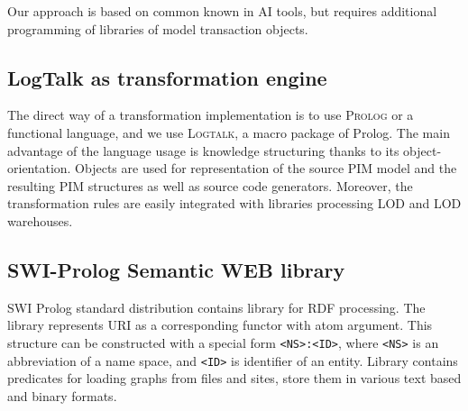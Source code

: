 \documentclass[conference]{IEEEtran}
\begin{document}


Our approach is based on common known in AI tools, but requires additional programming of libraries of model transaction objects.

\subsection{LogTalk as transformation engine}
\label{sec:logtalk-engine}

The direct way of a transformation implementation is to use \textsc{Prolog} or a functional language, and we use \textsc{Logtalk}, a macro package of Prolog.  The main advantage of the language usage is knowledge structuring thanks to its object-orientation.  Objects are used for representation of the source PIM model and the resulting PIM structures as well as source code generators.  Moreover, the transformation rules are easily integrated with libraries processing LOD and LOD warehouses.


\subsection{SWI-Prolog Semantic WEB library}
\label{sec:swi-sw}

SWI Prolog standard distribution contains library for RDF processing.  The library represents URI as a corresponding functor with atom argument. This structure can be constructed with a special form \texttt{<NS>:<ID>}, where \texttt{<NS>} is an abbreviation of a name space, and \texttt{<ID>} is identifier of an entity.  Library contains predicates for loading graphs from files and sites, store them in various text based and binary formats.
\end{document}

